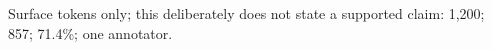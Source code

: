 Surface tokens only; this deliberately does not state a supported claim: 1,200; 857; 71.4\%; one annotator.
